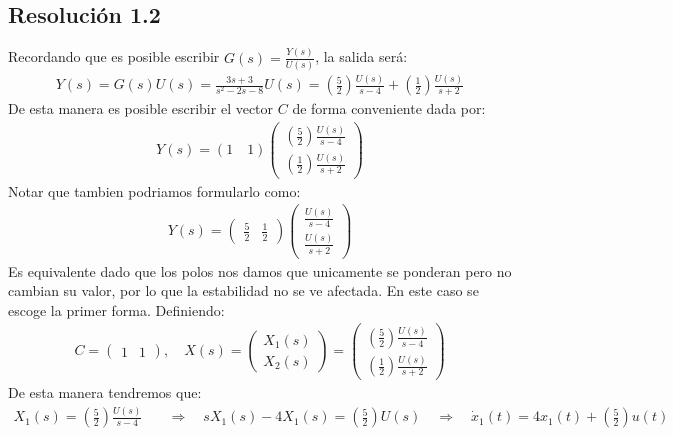 \documentclass[
  11pt,
  letterpaper,
   addpoints,
   answers
  ]{exam}
\begin{document}
\begin{questions}
\begin{solution}
  \subsection*{Resolución 1.2}
Recordando que es posible escribir $G(s)= \frac{Y(s)}{U(s)}$, la salida será:
\begin{align}
      Y(s) = G(s)U(s) = \frac{3s+3}{s^{2}-2s-8}U(s) = \left(\frac{5}{2}\right)\frac{U(s)}{s-4} + \left(\frac{1}{2}\right)\frac{U(s)}{s+2}
\end{align}
De esta manera es posible escribir el vector $C$ de forma conveniente dada por:
\begin{align}
  Y(s) = (1 \quad 1) \begin{pmatrix} \left(\frac{5}{2}\right)\frac{U(s)}{s-4} \\ \left(\frac{1}{2}\right)\frac{U(s)}{s+2} \end{pmatrix}
\end{align}
Notar que tambien podriamos formularlo como:
\begin{align}
  Y(s) = \begin{pmatrix} \frac{5}{2} & \frac{1}{2}\end{pmatrix} \begin{pmatrix} \frac{U(s)}{s-4} \\ \frac{U(s)}{s+2} \end{pmatrix}
\end{align}
Es equivalente dado que los polos nos damos que unicamente se ponderan pero no cambian su valor, por lo que la estabilidad no se ve afectada. En este caso se escoge la primer forma. Definiendo:
\begin{align}
  C= \begin{pmatrix} 1 & 1 \end{pmatrix}, \quad X(s) = \begin{pmatrix} X_1(s) \\ X_2(s) \end{pmatrix} = \begin{pmatrix} \left(\frac{5}{2}\right)\frac{U(s)}{s-4} \\ \left(\frac{1}{2}\right)\frac{U(s)}{s+2} \end{pmatrix}
\end{align}
De esta manera tendremos que:
\begin{align}
  X_1(s) = \left(\frac{5}{2}\right)\frac{U(s)}{s-4} \quad &\Longrightarrow \quad sX_1(s) - 4X_1(s) = \left(\frac{5}{2}\right)U(s) \quad \Longrightarrow \quad \dot{x}_1(t) = 4x_1(t) + \left(\frac{5}{2}\right)u(t) \\

\end{align}
\end{solution}
\end{questions}
\end{document}
